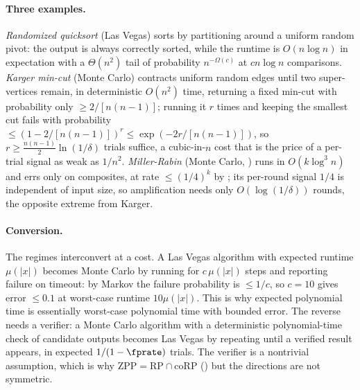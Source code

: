 \paragraph{Three examples.}
\emph{Randomized quicksort} (Las Vegas) sorts by partitioning around a uniform
random pivot: the output is always correctly sorted, while the runtime is
$O(n\log n)$ in expectation with a $\Theta(n^2)$ tail of probability
$n^{-\Omega(c)}$ at $cn\log n$ comparisons. \emph{Karger min-cut} (Monte Carlo)
contracts uniform random edges until two super-vertices remain, in
deterministic $O(n^2)$ time, returning a fixed min-cut with probability only
$\ge 2/[n(n-1)]$; running it $r$ times and keeping the smallest cut fails with
probability $\le (1 - 2/[n(n-1)])^r \le \exp(-2r/[n(n-1)])$, so $r \ge
\tfrac{n(n-1)}{2}\ln(1/\delta)$ trials suffice, a cubic-in-$n$ cost that is the
price of a per-trial signal as weak as $1/n^2$. \emph{Miller-Rabin} (Monte
Carlo, ) runs in $O(k\log^3 n)$ and errs only on
composites, at rate $\le (1/4)^k$ by ; its
per-round signal $1/4$ is independent of input size, so amplification needs only
$O(\log(1/\delta))$ rounds, the opposite extreme from Karger.

\paragraph{Conversion.}
The regimes interconvert at a cost. A Las Vegas algorithm with expected runtime
$\mu(|x|)$ becomes Monte Carlo by running for $c\,\mu(|x|)$ steps and reporting
failure on timeout: by Markov the failure probability is $\le 1/c$, so $c = 10$
gives error $\le 0.1$ at worst-case runtime $10\mu(|x|)$. This is why expected
polynomial time is essentially worst-case polynomial time with bounded error.
The reverse needs a verifier: a Monte Carlo algorithm with a deterministic
polynomial-time check of candidate outputs becomes Las Vegas by repeating until
a verified result appears, in expected $1/(1-\fprate)$ trials. The verifier is a
nontrivial assumption, which is why $\mathrm{ZPP} = \mathrm{RP} \cap
\mathrm{coRP}$ () but the directions are not symmetric.

